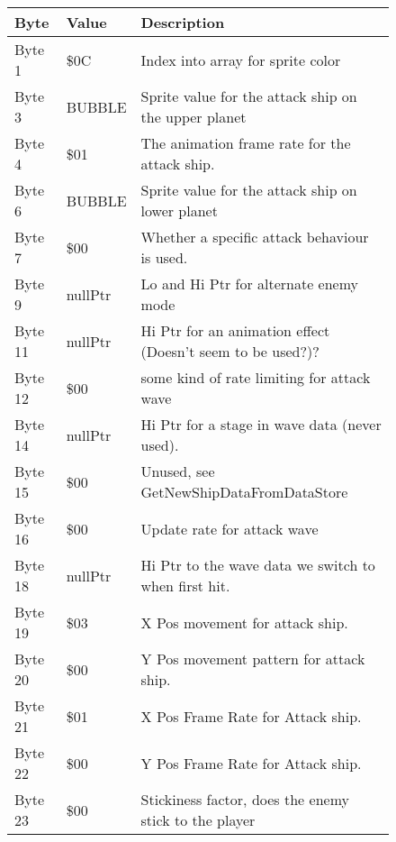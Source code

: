 \begin{figure}[H]
{\begin{adjustbox}{width=12cm}
\begin{tabular}{lll}
\toprule
 Byte    & Value             & Description                                                        \\
\midrule
 Byte 1  & \$0C               & Index into array for sprite color                                  \\
 Byte 3  & BUBBLE            & Sprite value for the attack ship on the upper planet               \\
 Byte 4  & \$01               & The animation frame rate for the attack ship.                      \\
 Byte 6  & BUBBLE            & Sprite value for the attack ship on lower planet                   \\
 Byte 7  & \$00               & Whether a specific attack behaviour is used.                       \\
 Byte 9  & nullPtr           & Lo and Hi Ptr for alternate enemy mode                             \\
 Byte 11 & nullPtr           & Hi Ptr for an animation effect (Doesn't seem to be used?)?         \\
 Byte 12 & \$00               & some kind of rate limiting for attack wave                         \\
 Byte 14 & nullPtr           & Hi Ptr for a stage in wave data (never used).                      \\
 Byte 15 & \$00               & Unused, see GetNewShipDataFromDataStore                            \\
 Byte 16 & \$00               & Update rate for attack wave                                        \\
 Byte 18 & nullPtr           & Hi Ptr to the wave data we switch to when first hit.               \\
 Byte 19 & \$03               & X Pos movement for attack ship.                                    \\
 Byte 20 & \$00               & Y Pos movement pattern for attack ship.                            \\
 Byte 21 & \$01               & X Pos Frame Rate for Attack ship.                                  \\
 Byte 22 & \$00               & Y Pos Frame Rate for Attack ship.                                  \\
 Byte 23 & \$00               & Stickiness factor, does the enemy stick to the player              \\

\end{tabular}
\end{adjustbox}}
\end{figure}
